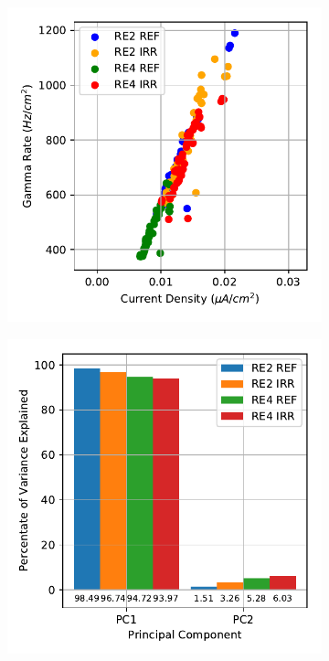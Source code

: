 	\begin{figure}[H]
    	\begin{subfigure}{0.5\linewidth}
    		\centering
			\includegraphics[width = \linewidth]{fig/chapt5/Gamma_rate-vs-Current_density.pdf}
        	\caption{\label{fig:GIFpp-J_R_correlation:A}}
    	\end{subfigure}
    	\begin{subfigure}{0.5\linewidth}
			\centering
    		\includegraphics[width = \linewidth]{fig/chapt5/Scree_plot_J-vs-R.pdf}

\end{subfigure}
\end{figure}
